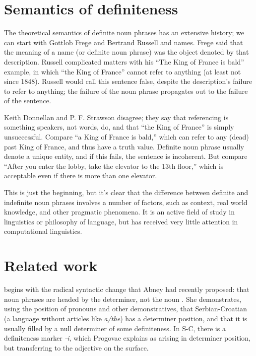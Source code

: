 \documentclass[11pt]{article}
\begin{document}
\section{}




\section{Semantics of definiteness}
The theoretical semantics of definite noun phrases has an extensive history; we can start with Gottlob Frege and Bertrand Russell and names. Frege said that the meaning of a name (or definite noun phrase) was the object denoted by that description. Russell complicated matters with his ``The King of France is bald'' example, in which ``the King of France'' cannot refer to anything (at least not since 1848). Russell would call this sentence false, despite the description's failure to refer to anything; the failure of the noun phrase propagates out to the failure of the sentence.

Keith Donnellan and P. F. Strawson disagree; they say that referencing is something speakers, not words, do, and that ``the King of France'' is simply unsuccessful.
Compare ``a King of France is bald,'' which can refer to any (dead) past King of France, and thus have a truth value. Definite noun phrase usually denote a unique entity, and if this fails, the sentence is incoherent. But compare ``After you enter the lobby, take the elevator to the 13th floor,'' which is acceptable even if there is more than one elevator.

This is just the beginning, but it's clear that the difference between definite and indefinite noun phrases involves a number of factors, such as context, real world knowledge, and other pragmatic phenomena. It is an active field of study in linguistics or philosophy of language, but has received very little attention in computational linguistics.




\section{Related work}

\citet{progovac:1995} begins with the radical syntactic change that Abney had recently proposed: that noun phrases are headed by the determiner, not the noun \citep{abney:1987}. She demonstrates, using the position of pronouns and other demonstratives, that Serbian-Croatian (a language without articles like \emph{a/the}) has a determiner position, and that it is usually filled by a null determiner of some definiteness. In S-C, there is a definiteness marker \emph{-i}, which Progovac explains as arising in determiner position, but transferring to the adjective on the surface.
\end{document}
